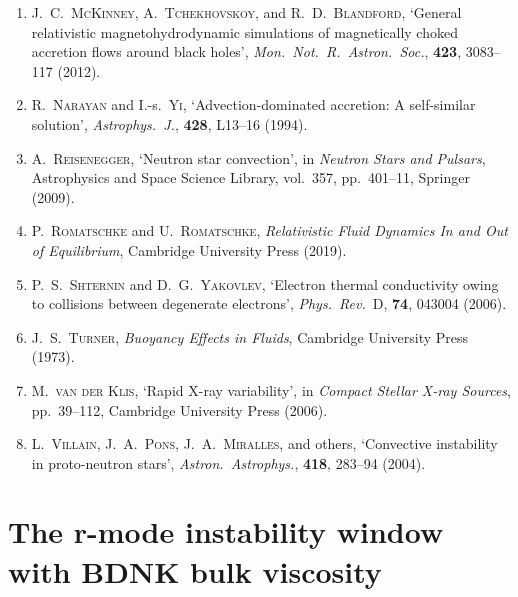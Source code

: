 \begin{enumerate}
\item J.~C.~\textsc{McKinney}, A.~\textsc{Tchekhovskoy}, and
  R.~D.~\textsc{Blandford}, `General relativistic
  magnetohydrodynamic simulations of magnetically choked accretion
  flows around black holes', \emph{Mon.\ Not.\ R.\ Astron.\ Soc.},
  \textbf{423}, 3083--117 (2012).

\item R.~\textsc{Narayan} and I.-s.~\textsc{Yi}, `Advection-dominated
  accretion: A self-similar solution', \emph{Astrophys.\ J.},
  \textbf{428}, L13--16 (1994).

\item A.~\textsc{Reisenegger}, `Neutron star convection', in
  \emph{Neutron Stars and Pulsars}, Astrophysics and Space Science
  Library, vol.~357, pp.~401--11, Springer (2009).

\item P.~\textsc{Romatschke} and U.~\textsc{Romatschke},
  \emph{Relativistic Fluid Dynamics In and Out of Equilibrium},
  Cambridge University Press (2019).

\item P.~S.~\textsc{Shternin} and D.~G.~\textsc{Yakovlev}, `Electron
  thermal conductivity owing to collisions between degenerate
  electrons', \emph{Phys.\ Rev.}~D, \textbf{74}, 043004 (2006).

\item J.~S.~\textsc{Turner}, \emph{Buoyancy Effects in Fluids},
  Cambridge University Press (1973).

\item M.~\textsc{van der Klis}, `Rapid X-ray variability', in
  \emph{Compact Stellar X-ray Sources}, pp.~39--112, Cambridge
  University Press (2006).

\item L.~\textsc{Villain}, J.~A.~\textsc{Pons},
  J.~A.~\textsc{Miralles}, and others, `Convective instability in
  proto-neutron stars', \emph{Astron.\ Astrophys.}, \textbf{418},
  283--94 (2004).
\end{enumerate}


\section{The r-mode instability window with BDNK bulk viscosity}
\label{sec:deep11-rmode}

